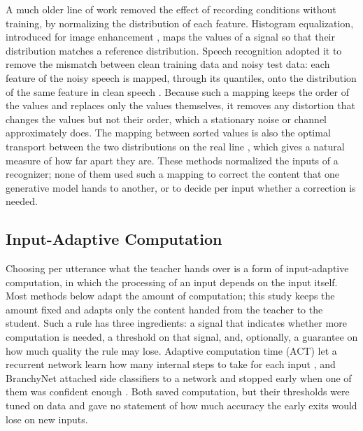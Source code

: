 A much older line of work removed the effect of recording conditions without training, by normalizing the distribution of each feature. Histogram equalization, introduced for image enhancement \parencite{hall1974histogram}, maps the values of a signal so that their distribution matches a reference distribution. Speech recognition adopted it to remove the mismatch between clean training data and noisy test data: each feature of the noisy speech is mapped, through its quantiles, onto the distribution of the same feature in clean speech \parencite{dharanipragada2000nonlinear,delatorre2005histogram,hilger2006quantile}. Because such a mapping keeps the order of the values and replaces only the values themselves, it removes any distortion that changes the values but not their order, which a stationary noise or channel approximately does. The mapping between sorted values is also the optimal transport between the two distributions on the real line \parencite{peyre2019computational}, which gives a natural measure of how far apart they are. These methods normalized the inputs of a recognizer; none of them used such a mapping to correct the content that one generative model hands to another, or to decide per input whether a correction is needed.

\subsection{Input-Adaptive Computation}
\label{sec:rrl-adaptive}

Choosing per utterance what the teacher hands over is a form of input-adaptive computation, in which the processing of an input depends on the input itself. Most methods below adapt the amount of computation; this study keeps the amount fixed and adapts only the content handed from the teacher to the student. Such a rule has three ingredients: a signal that indicates whether more computation is needed, a threshold on that signal, and, optionally, a guarantee on how much quality the rule may lose. Adaptive computation time (ACT) let a recurrent network learn how many internal steps to take for each input \parencite{graves2016act}, and BranchyNet attached side classifiers to a network and stopped early when one of them was confident enough \parencite{teerapittayanon2016branchynet}. Both saved computation, but their thresholds were tuned on data and gave no statement of how much accuracy the early exits would lose on new inputs.

